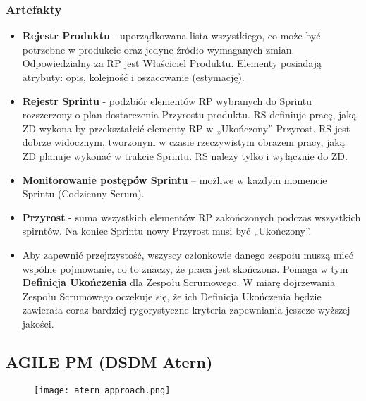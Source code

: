 \documentclass[a4paper]{article}
\begin{document}
    \subsubsection{Artefakty}
    \begin{itemize}
        \item \textbf{Rejestr Produktu} - uporządkowana lista wszystkiego,
        co może być potrzebne w produkcie oraz jedyne źródło wymaganych zmian.
        Odpowiedzialny za RP jest Właściciel Produktu.
        Elementy posiadają atrybuty: opis, kolejność i oszacowanie (estymację).
        \item \textbf{Rejestr Sprintu} - podzbiór elementów RP wybranych do Sprintu rozszerzony o plan
        dostarczenia Przyrostu produktu.
        RS definiuje pracę, jaką ZD wykona by przekształcić elementy
        RP w „Ukończony” Przyrost.
        RS jest dobrze widocznym, tworzonym w czasie rzeczywistym obrazem pracy, jaką ZD planuje wykonać w trakcie Sprintu.
        RS należy tylko i wyłącznie do ZD.
        \\
        \item \textbf{Monitorowanie postępów Sprintu} – możliwe w każdym momencie Sprintu (Codzienny Scrum).
        \item \textbf{Przyrost} - suma wszystkich elementów RP zakończonych podczas wszystkich spirntów.
        Na koniec Sprintu nowy Przyrost musi być „Ukończony”.
        \item Aby zapewnić przejrzystość, wszyscy członkowie danego zespołu muszą mieć wspólne
        pojmowanie, co to znaczy, że praca jest skończona. Pomaga w tym \textbf{Definicja Ukończenia}
        dla Zespołu Scrumowego. W miarę dojrzewania Zespołu Scrumowego oczekuje się, że ich Definicja Ukończenia będzie
        zawierała coraz bardziej rygorystyczne kryteria zapewniania jeszcze wyższej jakości.
    \end{itemize}

    \subsection{AGILE PM (DSDM Atern)}

    \begin{figure}[H]
        \texttt{[image: atern\_approach.png]}
    \end{figure}
\end{document}
